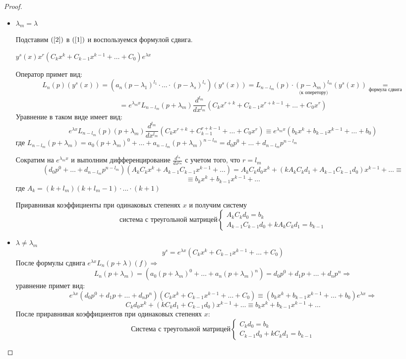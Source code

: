 \begin{proof}
\begin{itemize}
    \item $\lambda_m=\lambda$ \par
    Подставим $(\ref{2})$  в $(\ref{1})$ и воспользуемся формулой сдвига.\par
    $y^s(x)x^r(C_kx^k+C_{k-1}x^{k-1}+\dots + C_0)e^{\lambda x}$\par
    Оператор примет вид:
    $$L_n(p)(y^s(x))=(a_n(p-\lambda_1)^{l_1}\cdot...\cdot (p-\lambda_s)^{l_s})(y^s(x))=
    L_{n-l_m}(p)\cdot \underset{\text{(к оперетору)}}{(p-\lambda_m)^{l_m}}(y^s(x))\underset{\text{формула сдвига}}{=}
    $$$$=e^{\lambda_m x}L_{n-l_m}(p+\lambda_m)\frac{d^{l_m}}{dx^{l_m}}(C_kx^{r+k}+C_{k-1}x^{r+k-1}+\dots+C_0x^r)$$
    Уравнение в таком виде имеет вид:
    $$e^{\lambda x}L_{n-l_m}(p)(p+\lambda_m)\frac{d^{l_m}}{dx^{l_m}}(C_kx^{r+k}+C_{k-1}^{r+k-1}+\dots+C_0x^r)\equiv e^{\lambda_m x}(b_kx^k+b_{k-1}x^{k-1}+\dots+b_0)$$
    где $L_{n-l_m}(p+\lambda_m)=a_0(p+\lambda_m)^0+\dots+ a_{n-l_m}(p+\lambda_m)^{n-l_m}=d_0p^0+\dots+ d_{n-l_m}p^{n-l_m}$\par
    Сократим на $e^{\lambda_m x}$ и выполним дифференцирование $\frac{d^{l_m}}{dx^{l_m}}$ с учетом того, что $r=l_m$
    $$(d_0p^0+\dots + d_{n-l_m}p^{n-l_m})(A_kC_kx^k+A_{k-1}C_{k-1}x^{k-1}+\dots)=A_kC_kd_0x^k+(kA_kC_kd_1+A_{k-1}C_{k-1}d_0)x^{k-1}+\dots \equiv$$$$\equiv b_kx^k+b_{k-1}x^{k-1}+\dots$$ где $A_k=(k+l_m)(k+l_m-1)\cdot ... \cdot (k+1)$\par
    Приравнивая коэффициенты при одинаковых степенях $x$ и получим систему 
    \begin{equation}
       \text{система с треугольной матрицей}
        \begin{cases}
            A_kC_kd_0=b_k\\
            A_{k-1}C_{k-1}d_0+kA_kC_kd_1=b_{k-1}
        \end{cases}
    \end{equation}
    \item $\lambda\neq \lambda_m$
    $$y^s=e^{\lambda x}(C_kx^k+C_{k-1}x^{k-1}+\dots+ C_0)$$
    После формулы сдвига $e^{\lambda x}L_n(p+\lambda)(f)\Rightarrow$
    $$L_n(p+\lambda_m)=(a_0(p+\lambda_m)^0+\dots+a_n(p+\lambda_m)^n)=d_0p^0+d_1p+\dots+d_np^n\Rightarrow$$
    уравнение примет вид:
    $$e^{\lambda x}(d_0p^0+d_1p+\dots+d_np^n)(C_kx^k+C_{k-1}x^{k-1}+\dots+C_0)\equiv (b_kx^k+b_{k-1}x^{k-1}+\dots +b_0)e^{\lambda x}\Rightarrow$$
    $$C_kd_0x^k+(kC_kd_1+C_{k-1}d_0)x^{k-1}+\dots\equiv b_kx^k+b_{k-1}x^{k-1}+\dots$$
    После приравнивая коэффициентов при одинаковых степенях $x$:
    \begin{equation}
    \text{Система с треугольной матрицей}
        \begin{cases}
            C_kd_0=b_k\\
            C_{k-1}d_0+kC_kd_1=b_{k-1}
        \end{cases}
    \end{equation}
\end{itemize}
\end{proof}
